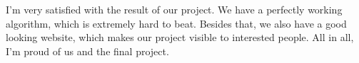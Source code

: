 I'm very satisfied with the result of our project. We have a perfectly working algorithm, which is extremely hard to beat. Besides that, we also have a good looking website, which makes our project visible to interested people. All in all, I'm proud of us and the final project.






















